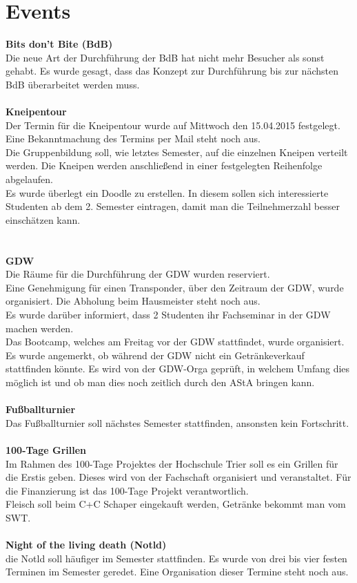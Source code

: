 \documentclass[a4paper, 11pt]{article} %
\begin{document}
\section{Events}
\textbf{Bits don't Bite (BdB)} \\
Die neue Art der Durchführung der BdB hat nicht mehr Besucher als sonst gehabt. Es wurde gesagt, dass das Konzept zur Durchführung bis zur nächsten BdB überarbeitet werden muss. \\
\\
\textbf{Kneipentour} \\
Der Termin für die Kneipentour wurde auf Mittwoch den 15.04.2015 festgelegt. Eine Bekanntmachung des Termins per Mail steht noch aus.\\
Die Gruppenbildung soll, wie letztes Semester, auf die einzelnen Kneipen verteilt werden. Die Kneipen werden anschließend in einer festgelegten Reihenfolge abgelaufen. \\
Es wurde überlegt ein Doodle zu erstellen. In diesem sollen sich interessierte Studenten ab dem 2. Semester eintragen, damit man die Teilnehmerzahl besser einschätzen kann. \\
\\
\\
\textbf{GDW} \\
Die Räume für die Durchführung der GDW wurden reserviert. \\
Eine Genehmigung für einen Transponder, über den Zeitraum der GDW, wurde organisiert. Die Abholung beim Hausmeister steht noch aus. \\
Es wurde darüber informiert, dass 2 Studenten ihr Fachseminar in der GDW machen werden. \\
Das Bootcamp, welches am Freitag vor der GDW stattfindet, wurde organisiert. \\
Es wurde angemerkt, ob während der GDW nicht ein Getränkeverkauf stattfinden könnte. Es wird von der GDW-Orga geprüft, in welchem Umfang dies möglich ist und ob man dies noch zeitlich durch den AStA bringen kann. \\
\\
\textbf{Fußballturnier} \\
Das Fußballturnier soll nächstes Semester stattfinden, ansonsten kein Fortschritt. \\
\\
\textbf{100-Tage Grillen} \\
Im Rahmen des 100-Tage Projektes der Hochschule Trier soll es ein Grillen für die Erstis geben. Dieses wird von der Fachschaft organisiert und veranstaltet. Für die Finanzierung ist das 100-Tage Projekt verantwortlich. \\
Fleisch soll beim C+C Schaper eingekauft werden, Getränke bekommt man vom SWT.\\
\\
\textbf{Night of the living death (Notld)} \\
die Notld soll häufiger im Semester stattfinden. Es wurde von drei bis vier festen Terminen im Semester geredet. Eine Organisation dieser Termine steht noch aus. \\
\end{document}
